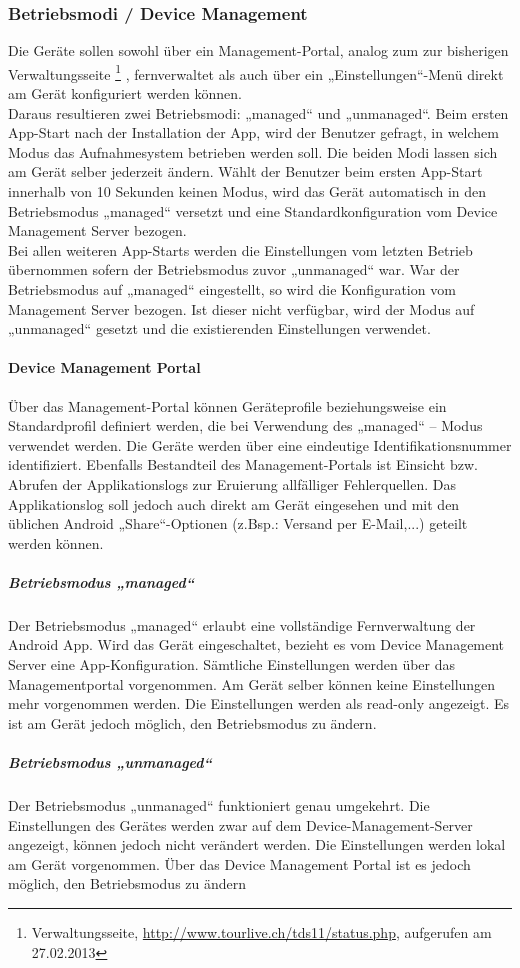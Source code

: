 \subsubsection{Betriebsmodi / Device Management}
Die Geräte sollen sowohl über ein Management-Portal, analog zum zur bisherigen Verwaltungsseite \footnote{Verwaltungsseite, \url{http://www.tourlive.ch/tds11/status.php}, aufgerufen am 27.02.2013} , fernverwaltet als auch über ein „Einstellungen“-Menü direkt am Gerät konfiguriert werden können. \\

Daraus resultieren zwei Betriebsmodi: „managed“ und „unmanaged“. Beim ersten App-Start nach der Installation der App, wird der Benutzer gefragt, in welchem Modus das Aufnahmesystem betrieben werden soll. Die beiden Modi lassen sich am Gerät selber jederzeit ändern. Wählt der Benutzer beim ersten App-Start innerhalb von 10 Sekunden keinen Modus, wird das Gerät automatisch in den Betriebsmodus „managed“ versetzt und eine Standardkonfiguration vom Device Management Server bezogen.\\

Bei allen weiteren App-Starts werden die Einstellungen vom letzten Betrieb übernommen sofern der Betriebsmodus zuvor „unmanaged“ war. War der Betriebsmodus auf „managed“ eingestellt, so wird die Konfiguration vom Management Server bezogen. Ist dieser nicht verfügbar, wird der Modus auf „unmanaged“ gesetzt und die existierenden Einstellungen verwendet.
\paragraph{Device Management Portal}
Über das Management-Portal können Geräteprofile beziehungsweise ein Standardprofil definiert werden, die bei Verwendung des „managed“ – Modus verwendet werden. Die Geräte werden über eine eindeutige Identifikationsnummer identifiziert.
Ebenfalls Bestandteil des Management-Portals ist Einsicht bzw. Abrufen der Applikationslogs zur Eruierung allfälliger Fehlerquellen. Das Applikationslog soll jedoch auch direkt am Gerät eingesehen und mit den üblichen Android „Share“-Optionen (z.Bsp.: Versand per E-Mail,...) geteilt werden können.
\subparagraph{Betriebsmodus „managed“}
Der Betriebsmodus „managed“ erlaubt eine vollständige Fernverwaltung der Android App. Wird das Gerät eingeschaltet, bezieht es vom Device Management Server eine App-Konfiguration. Sämtliche Einstellungen werden über das Managementportal vorgenommen. Am Gerät selber können keine Einstellungen mehr vorgenommen werden. Die Einstellungen werden als read-only angezeigt. Es ist am Gerät jedoch möglich, den Betriebsmodus zu ändern.
\subparagraph{Betriebsmodus „unmanaged“}
Der Betriebsmodus „unmanaged“ funktioniert genau umgekehrt. Die Einstellungen des Gerätes werden zwar auf dem Device-Management-Server angezeigt, können jedoch nicht verändert werden. Die Einstellungen werden lokal am Gerät vorgenommen.  Über das Device Management Portal ist es jedoch möglich, den Betriebsmodus zu ändern
